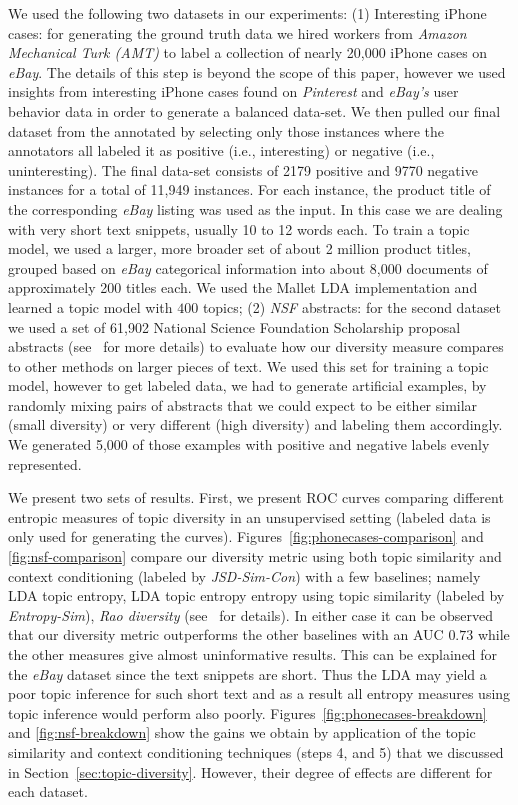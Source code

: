 \documentclass{article} %
\begin{document}
We used the following two datasets in our experiments: (1) Interesting iPhone cases:
for generating the ground truth data we hired workers from {\em Amazon Mechanical Turk (AMT)} to label a collection
of nearly 20,000 iPhone cases on {\em eBay}. The details of this step is beyond the scope of this paper, however we used insights from
interesting iPhone cases found on {\em Pinterest} and {\em eBay's} user behavior data in order to generate a balanced data-set. 
We then pulled our final dataset from the annotated by selecting only those instances where the annotators all labeled it as
positive (i.e., interesting) or negative (i.e., uninteresting). The final data-set consists of 2179 positive and 9770 negative instances for
a total of 11,949 instances. For each instance, the product title of
the corresponding {\em eBay} listing was used as the input. In this case we are
dealing with very short text snippets, usually 10 to 12 words each. To
train a topic model, we used a larger, more broader set of about
2 million product titles, grouped based on {\em eBay} categorical information into about 8,000
documents of approximately 200 titles each. We used the Mallet LDA implementation and learned a topic model with $400$ topics; (2) {\em NSF}
abstracts: for the second dataset we used a set of 61,902 National Science Foundation
Scholarship proposal abstracts (see~\cite{bache:2013} for more details) to evaluate how our diversity measure
compares to other methods on larger pieces of text. We used this set
for training a topic model, however to get labeled data, we had to
generate artificial examples, by randomly mixing pairs of abstracts that we
could expect to be either similar (small diversity) or very different
(high diversity) and labeling them accordingly. We generated 5,000 of
those examples with positive and negative labels evenly represented.

We present two sets of results. First, we present
ROC curves comparing different entropic measures of topic diversity in an unsupervised setting 
(labeled data is only used for generating the curves). Figures~\ref{fig:phonecases-comparison} and \ref{fig:nsf-comparison}
compare our diversity metric using both topic similarity and context conditioning (labeled by {\em JSD-Sim-Con}) with a few baselines; namely LDA topic entropy, LDA topic entropy entropy using topic similarity (labeled by {\em Entropy-Sim}), {\em Rao diversity} (see~\cite{bache:2013} for details). In either case it can be observed that our diversity metric outperforms the other baselines with an AUC $0.73$ while the other measures give almost uninformative results. This can be explained for the {\em eBay} dataset since the text snippets are short. Thus the LDA may yield a poor topic inference for such short text and as a result all entropy measures using topic inference would perform also poorly. Figures~\ref{fig:phonecases-breakdown} and \ref{fig:nsf-breakdown} show the gains we obtain by application of the topic similarity and context conditioning techniques (steps 4, and 5) that we discussed in Section~\ref{sec:topic-diversity}. However, their degree of effects are different for each
dataset. 
\end{document}
